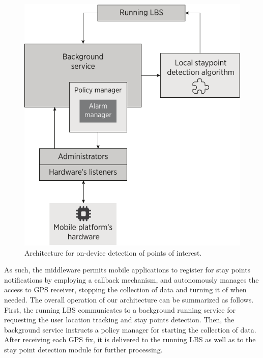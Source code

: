 \documentclass[ENG,PhD]{cinvestav}
\begin{document}
\begin{figure}[t]
  \centering
  \includegraphics[scale=0.75]{architecture-for-gps-policies}
  \caption{Architecture for on-device detection of points of interest.}
  \label{fig:on-device-stay-point-detection-architecture}
\end{figure}


As such, the middleware permits mobile applications to register for stay points notifications by employing a callback mechanism, and autonomously manages the access to GPS receiver, stopping the collection of data and turning it of when needed.
The overall operation of our architecture can be summarized as follows.
First, the running LBS communicates to a background running service for requesting the user location tracking and stay points detection.
Then, the background service instructs a policy manager for starting the collection of data. 
After receiving each GPS fix, it is delivered to the running LBS as well as to the stay point detection module for further processing.
\end{document}
